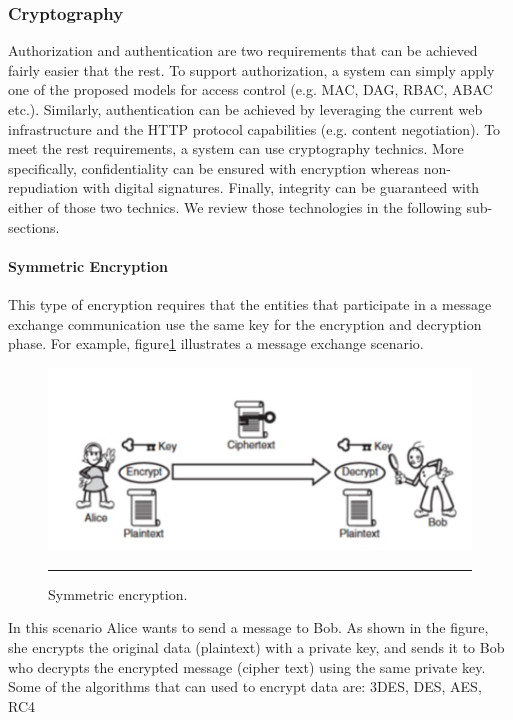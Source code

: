 \subsubsection{Cryptography}

Authorization and authentication are two requirements that can be achieved fairly easier that the rest. To support authorization, a system can simply apply one of the proposed models for access control (e.g. MAC\cite{mac}, DAG\cite{dag}, RBAC\cite{rbac}, ABAC\cite{abac} etc.). Similarly, authentication can be achieved by leveraging the current web infrastructure and the HTTP protocol capabilities (e.g. content negotiation). To meet the rest requirements, a system can use cryptography technics. More specifically, confidentiality can be ensured with encryption\cite{cryptography} whereas non-repudiation with digital signatures\cite{digitalSignatures}. Finally, integrity can be guaranteed with either of those two technics. We review those technologies in the following sub-sections.

\paragraph{Symmetric Encryption}

This type of encryption requires that the entities that participate in a message exchange communication use the same key for the encryption and decryption phase. For example, figure\ref{fig:symmetricEncryption} illustrates a message exchange scenario.

\begin{figure}[htbp]
	\centering
		\includegraphics{./Figures/figure12.pdf}
		\rule{35em}{0.5pt}
	\caption[Symmetric Encryption]{Symmetric encryption\cite{Graham:2001:BWS:559927}.}
	\label{fig:symmetricEncryption}
\end{figure}

In this scenario Alice wants to send a message to Bob. As shown in the figure, she encrypts the original data (plaintext) with a private key, and sends it to Bob who decrypts the encrypted message (cipher text) using the same private key. Some of the algorithms that can used to encrypt data are: 3DES, DES, AES, RC4

